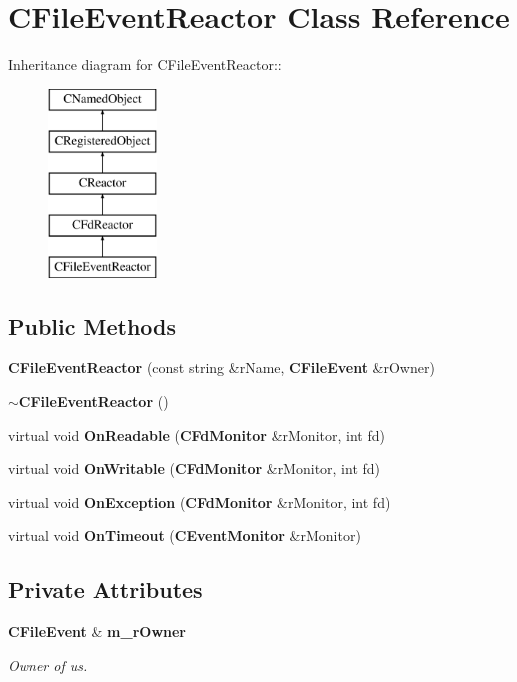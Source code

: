 \section{CFile\-Event\-Reactor  Class Reference}
\label{classCFileEvent_1_1CFileEventReactor}
Inheritance diagram for CFile\-Event\-Reactor::\begin{figure}[H]
\begin{center}
\leavevmode
\includegraphics[height=5cm]{classCFileEvent_1_1CFileEventReactor}
\end{center}
\end{figure}
\subsection*{Public Methods}
\begin{CompactItemize}
\item 
{\bf CFile\-Event\-Reactor} (const string \&r\-Name, {\bf CFile\-Event} \&r\-Owner)
\item 
{\bf $\sim$CFile\-Event\-Reactor} ()
\item 
virtual void {\bf On\-Readable} ({\bf CFd\-Monitor} \&r\-Monitor, int fd)
\item 
virtual void {\bf On\-Writable} ({\bf CFd\-Monitor} \&r\-Monitor, int fd)
\item 
virtual void {\bf On\-Exception} ({\bf CFd\-Monitor} \&r\-Monitor, int fd)
\item 
virtual void {\bf On\-Timeout} ({\bf CEvent\-Monitor} \&r\-Monitor)
\end{CompactItemize}
\subsection*{Private Attributes}
\begin{CompactItemize}
\item 
{\bf CFile\-Event} \& {\bf m\_\-r\-Owner}
\begin{CompactList}\small\item\em Owner of us.\item\end{CompactList}\end{CompactItemize}


